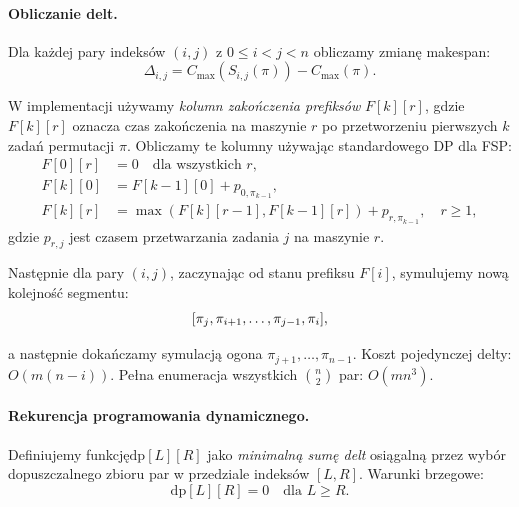 \paragraph{Obliczanie delt.} Dla każdej pary indeksów $(i,j)$ z $0 \le i < j < n$ obliczamy zmianę makespan:
\begin{equation}\label{delta_ij}
\Delta_{i,j} = C_{\max}(S_{i,j}(\pi)) - C_{\max}(\pi).
\end{equation}

W implementacji używamy \emph{kolumn zakończenia prefiksów} $F[k][r]$, gdzie $F[k][r]$ oznacza czas zakończenia na maszynie $r$ po przetworzeniu pierwszych $k$ zadań permutacji $\pi$. Obliczamy te kolumny używając standardowego DP dla FSP:
\begin{equation}\label{eq_F_kr}
\begin{aligned}
F[0][r] &= 0 \quad \text{dla wszystkich } r, \\
F[k][0] &= F[k-1][0] + p_{0,\pi_{k-1}}, \\
F[k][r] &= \max(F[k][r-1], F[k-1][r]) + p_{r,\pi_{k-1}}, \quad r \ge 1,
\end{aligned}
\end{equation}
gdzie $p_{r,j}$ jest czasem przetwarzania zadania $j$ na maszynie $r$.

Następnie dla pary $(i,j)$, zaczynając od stanu prefiksu $F[i]$, symulujemy nową kolejność segmentu:
\begin{equation}\label{new_perm}
\begin{aligned}
\relax[\pi_j, \pi_{i+1}, \ldots, \pi_{j-1}, \pi_i],
\end{aligned}
\end{equation}

a następnie dokańczamy symulacją ogona $\pi_{j+1}, \ldots, \pi_{n-1}$. Koszt pojedynczej delty: $O(m(n-i))$. Pełna enumeracja wszystkich $\binom{n}{2}$ par: $O(mn^3)$.

\paragraph{Rekurencja programowania dynamicznego.} Definiujemy funkcję\linebreak $\mathrm{dp}[L][R]$ jako \emph{minimalną sumę delt} osiągalną przez wybór dopuszczalnego zbioru par w przedziale indeksów $[L, R]$. Warunki brzegowe:
\begin{equation}\label{eq_dp_LR}
\mathrm{dp}[L][R] = 0 \quad \text{dla } L \ge R.
\end{equation}

